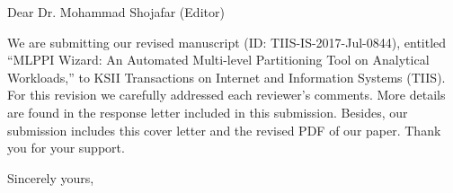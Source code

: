 \documentclass{letter} %
\begin{document}
\begin{letter}
\opening{Dear Dr. Mohammad Shojafar (Editor)} 
 
\noindent We are submitting our revised manuscript (ID: TIIS-IS-2017-Jul-0844), entitled ``MLPPI Wizard: An Automated Multi-level Partitioning Tool on Analytical Workloads,'' to KSII Transactions on Internet and Information Systems (TIIS). For this revision we carefully addressed each reviewer's comments. More details are found in the response letter included in this submission. Besides, our submission includes this cover letter and the revised PDF of our paper. Thank you for your support. 
 
\closing{Sincerely yours,} 

\end{letter}
 
\end{document}
